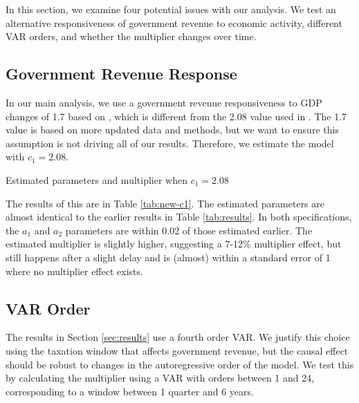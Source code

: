 In this section, we examine four potential issues with our analysis. We test an alternative responsiveness of government revenue to economic activity, different VAR orders, and whether the multiplier changes over time. 


\subsection{Government Revenue Response}

In our main analysis, we use a government revenue responsiveness to GDP changes of 1.7 based on \textcite{lutz2010fiscal}, which is different from the 2.08 value used in \textcite{blanchard2002empirical}. The 1.7 value is based on more updated data and methods, but we want to ensure this assumption is not driving all of our results. Therefore, we estimate the model with $c_1 = 2.08$.

\begin{table}[t]
    \centering
    \caption{Estimated parameters and multiplier when $c_1 = 2.08$}
    
    \label{tab:new-c1}
\end{table}

The results of this are in Table \ref{tab:new-c1}. The estimated parameters are almost identical to the earlier results in Table \ref{tab:results}. In both specifications, the $a_1$ and $a_2$ parameters are within 0.02 of those estimated earlier. The estimated multiplier is slightly higher, suggesting a 7-12\% multiplier effect, but still happens after a slight delay and is (almost) within a standard error of 1 where no multiplier effect exists.


\subsection{VAR Order}

The results in Section \ref{sec:results} use a fourth order VAR. We justify this choice using the taxation window that affects government revenue, but the causal effect should be robust to changes in the autoregressive order of the model. We test this by calculating the multiplier using a VAR with orders between 1 and 24, corresponding to a window between 1 quarter and 6 years.

